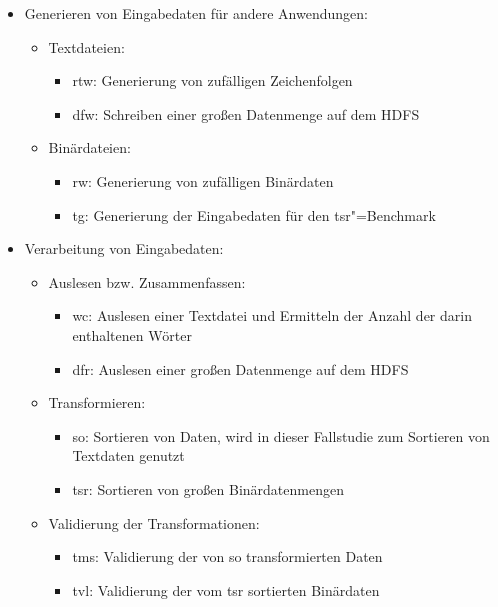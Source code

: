 \begin{itemize}
    \item Generieren von Eingabedaten für andere Anwendungen:
    \begin{itemize}
        \item Textdateien:
        \begin{itemize}
            \item \ac{rtw}: Generierung von zufälligen Zeichenfolgen
            \item \ac{dfw}: Schreiben einer großen Datenmenge auf dem \ac{HDFS}
        \end{itemize}
        \item Binärdateien:
        \begin{itemize}
            \item \ac{rw}: Generierung von zufälligen Binärdaten
            \item \ac{tg}: Generierung der Eingabedaten für den \acl{tsr}"=Benchmark
       \end{itemize}
    \end{itemize}

    \item Verarbeitung von Eingabedaten:
    \begin{itemize}
        \item Auslesen bzw. Zusammenfassen:
        \begin{itemize}
            \item \ac{wc}: Auslesen einer Textdatei und Ermitteln der Anzahl der darin enthaltenen Wörter
            \item \ac{dfr}: Auslesen einer großen Datenmenge auf dem \ac{HDFS}
        \end{itemize}
        \item Transformieren:
        \begin{itemize}
            \item \ac{so}: Sortieren von Daten, wird in dieser Fallstudie zum Sortieren von Textdaten genutzt
            \item \ac{tsr}: Sortieren von großen Binärdatenmengen
        \end{itemize}
        \item Validierung der Transformationen:
        \begin{itemize}
            \item \ac{tms}: Validierung der von \acl{so} transformierten Daten
            \item \ac{tvl}: Validierung der vom \acl{tsr} sortierten Binärdaten
        \end{itemize}
    \end{itemize}


\end{itemize}
